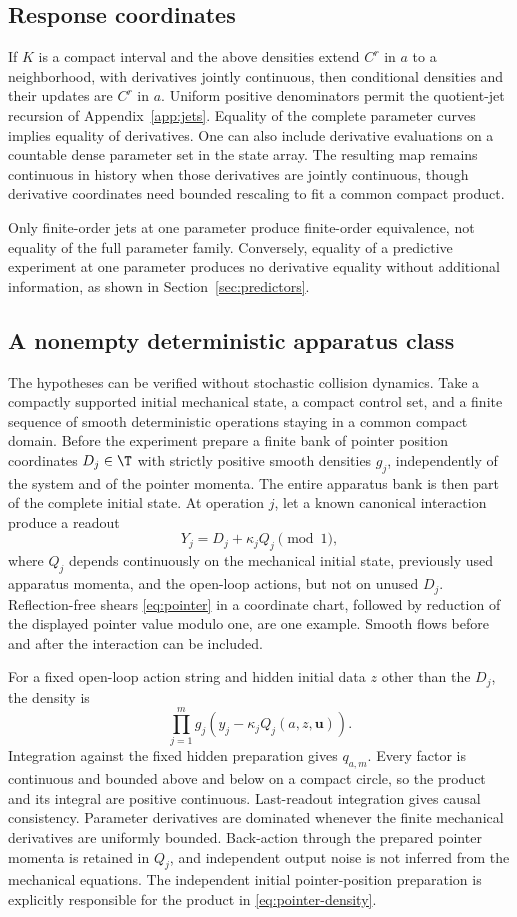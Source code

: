 \subsection{Response coordinates}
If $K$ is a compact interval and the above densities extend $C^r$ in $a$ to a neighborhood, with derivatives jointly continuous, then conditional densities and their updates are $C^r$ in $a$. Uniform positive denominators permit the quotient-jet recursion of Appendix~\ref{app:jets}. Equality of the complete parameter curves implies equality of derivatives. One can also include derivative evaluations on a countable dense parameter set in the state array. The resulting map remains continuous in history when those derivatives are jointly continuous, though derivative coordinates need bounded rescaling to fit a common compact product.

Only finite-order jets at one parameter produce finite-order equivalence, not equality of the full parameter family. Conversely, equality of a predictive experiment at one parameter produces no derivative equality without additional information, as shown in Section~\ref{sec:predictors}.

\subsection{A nonempty deterministic apparatus class}
The hypotheses can be verified without stochastic collision dynamics. Take a compactly supported initial mechanical state, a compact control set, and a finite sequence of smooth deterministic operations staying in a common compact domain. Before the experiment prepare a finite bank of pointer position coordinates $D_j\in\T$ with strictly positive smooth densities $g_j$, independently of the system and of the pointer momenta. The entire apparatus bank is then part of the complete initial state. At operation $j$, let a known canonical interaction produce a readout
\[
 Y_j=D_j+\kappa_j Q_j\pmod1,
\]
where $Q_j$ depends continuously on the mechanical initial state, previously used apparatus momenta, and the open-loop actions, but not on unused $D_j$. Reflection-free shears \eqref{eq:pointer} in a coordinate chart, followed by reduction of the displayed pointer value modulo one, are one example. Smooth flows before and after the interaction can be included.

For a fixed open-loop action string and hidden initial data $z$ other than the $D_j$, the density is
\begin{equation}
 \prod_{j=1}^m g_j(y_j-\kappa_jQ_j(a,z,\mathbf u)).
 \label{eq:pointer-density}
\end{equation}
Integration against the fixed hidden preparation gives $q_{a,m}$. Every factor is continuous and bounded above and below on a compact circle, so the product and its integral are positive continuous. Last-readout integration gives causal consistency. Parameter derivatives are dominated whenever the finite mechanical derivatives are uniformly bounded. Back-action through the prepared pointer momenta is retained in $Q_j$, and independent output noise is not inferred from the mechanical equations. The independent initial pointer-position preparation is explicitly responsible for the product in \eqref{eq:pointer-density}.

